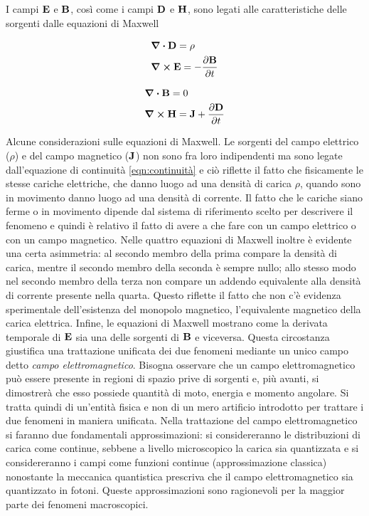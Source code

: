 I campi $\vb{E}$ e $\vb{B}$, così come i campi $\vb{D}$ e $\vb{H}$, sono legati alle caratteristiche
delle sorgenti dalle equazioni di Maxwell

\begin{minipage}[t]{0.5\textwidth}
    \[
        \begin{split}
            & \div{\vb{D}}=\rho                    \\
            & \curl{\vb{E}}=-\pdv{\vb{B}}{t}       \\
        \end{split}
    \]
\end{minipage}
\begin{minipage}[t]{0.5\textwidth}
    \[
        \begin{split}
            & \div{\vb{B}}=0                       \\
            & \curl{\vb{H}}=\vb{J}+\pdv{\vb{D}}{t} \\
        \end{split}
    \]
\end{minipage}
Alcune considerazioni sulle equazioni di Maxwell. Le sorgenti del campo elettrico ($\rho$) e del campo magnetico ($\vb{J}$)
non sono fra loro indipendenti ma sono legate dall'equazione di continuità \eqref{eqn:continuità} e ciò riflette
il fatto che fisicamente le stesse cariche elettriche, che danno luogo ad una densità di carica $\rho$, quando
sono in movimento danno luogo ad una densità di corrente. Il fatto che le cariche siano ferme o in
movimento dipende dal sistema di riferimento scelto per descrivere il fenomeno e quindi è relativo il fatto
di avere a che fare con un campo elettrico o con un campo magnetico.
Nelle quattro equazioni di Maxwell inoltre è evidente una certa asimmetria: al secondo membro della prima compare la densità di carica, mentre
il secondo membro della seconda è sempre nullo; allo stesso modo nel secondo membro della terza non compare un addendo
equivalente alla densità di corrente presente nella quarta. Questo riflette il fatto che non c'è evidenza sperimentale dell'esistenza
del monopolo magnetico, l'equivalente magnetico della carica elettrica.
Infine, le equazioni di Maxwell mostrano come la derivata temporale di $\vb{E}$ sia una delle sorgenti
di $\vb{B}$ e viceversa. Questa circostanza giustifica una trattazione unificata dei due fenomeni mediante un unico campo detto
\textit{campo elettromagnetico}. Bisogna osservare che un campo elettromagnetico può essere presente in regioni di spazio
prive di sorgenti e, più  avanti, si dimostrerà che esso possiede quantità di moto, energia e momento angolare. Si
tratta quindi di un'entità fisica e non di un mero artificio introdotto per trattare i due fenomeni in maniera unificata.
Nella trattazione del campo elettromagnetico si faranno due fondamentali approssimazioni: si considereranno le distribuzioni di
carica come continue, sebbene a livello microscopico la carica sia quantizzata e si considereranno i campi come funzioni
continue (approssimazione classica) nonostante la meccanica quantistica prescriva che il campo elettromagnetico sia quantizzato
in fotoni. Queste approssimazioni sono ragionevoli per la maggior parte dei fenomeni macroscopici.

